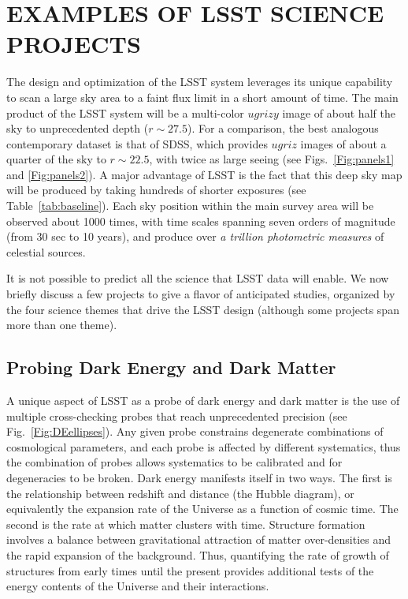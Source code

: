 
\section{  EXAMPLES OF LSST SCIENCE PROJECTS                    }
\label{Sec:science}

The design and optimization of the LSST system leverages its unique capability
to scan a large sky area to a faint flux limit in a short amount of time.
The main product of the LSST system will be a multi-color $ugrizy$ image of about
half the sky to unprecedented depth ($r\sim27.5$). For a comparison, the best
analogous contemporary dataset is that of SDSS, which provides $ugriz$ images
of about a quarter of the sky to $r\sim22.5$, with twice as large seeing
(see Figs.~\ref{Fig:panels1} and \ref{Fig:panels2}). A major advantage of LSST
is the fact that this deep sky map will be produced by taking hundreds of
shorter exposures (see Table~\ref{tab:baseline}). Each sky position within the main survey area
will be observed about 1000 times, with time scales spanning seven orders of
magnitude (from 30 sec to 10 years), and produce over {\it a trillion
photometric measures} of celestial sources.

It is not possible to predict all the science that LSST data will enable.
We now briefly discuss a few projects to give a flavor of anticipated studies,
organized by the four science themes that drive the LSST design
(although some projects span more than one theme).


\vskip 0.3in
\subsection{Probing Dark Energy and Dark Matter }

A unique aspect of LSST as a probe of dark energy and dark matter is
the use of multiple cross-checking probes that reach unprecedented
precision (see Fig.~\ref{Fig:DEellipses}). Any given probe constrains
degenerate combinations of cosmological parameters, and each probe is
affected by different systematics, thus the combination of probes
allows systematics to be calibrated and for degeneracies to be
broken.  Dark energy manifests itself in two ways.  The first is the
relationship between redshift and distance (the Hubble diagram), or
equivalently the expansion rate of the Universe as a function of
cosmic time.  The second is the rate at which matter clusters with
time.
Structure formation involves a balance between
gravitational attraction of matter over-densities and the rapid
expansion of the background.  Thus, quantifying the rate of growth of
structures from early times until the present provides additional
tests of the energy contents of the Universe and their interactions.

